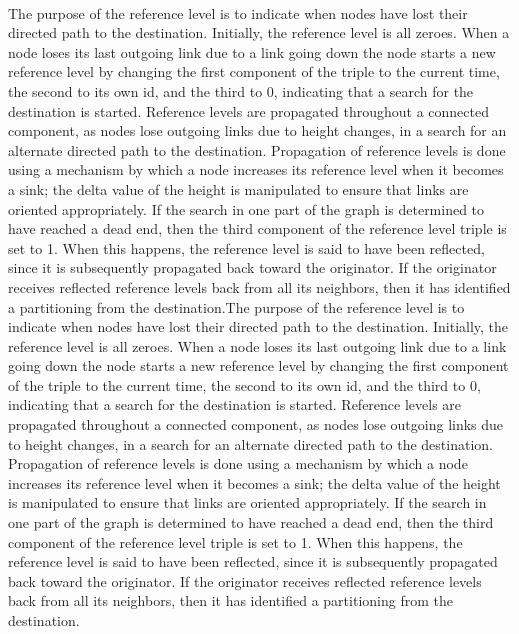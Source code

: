 \paragraph{}The purpose of the reference level is to indicate when nodes have lost their directed path to the destination. Initially, the reference level is all zeroes. When a node loses its last outgoing link due to a link going down the node starts a new reference level by changing the first component of the triple to the current time, the second to its own id, and the third to 0, indicating that a search for the destination is started. Reference levels are propagated throughout a connected component, as nodes lose outgoing links due to height changes, in a search for an alternate directed path to the destination. Propagation of reference levels is done using a mechanism by which a node increases its reference level when it becomes a sink; the delta value of the height is manipulated to ensure that links are oriented appropriately. If the search in one part of the graph is determined to have reached a dead end, then the third component of the reference level triple is set to 1. When this happens, the reference level is said to have been reflected, since it is subsequently propagated back toward the originator. If the originator receives reflected reference levels back from all its neighbors, then it has identified a partitioning from the destination.The purpose of the reference level is to indicate when nodes have lost their directed path to the destination. Initially, the reference level is all zeroes. When a node loses its last outgoing link due to a link going down the node starts a new reference level by changing the first component of the triple to the current time, the second to its own id, and the third to 0, indicating that a search for the destination is started. Reference levels are propagated throughout a connected component, as nodes lose outgoing links due to height changes, in a search for an alternate directed path to the destination. Propagation of reference levels is done using a mechanism by which a node increases its reference level when it becomes a sink; the delta value of the height is manipulated to ensure that links are oriented appropriately. If the search in one part of the graph is determined to have reached a dead end, then the third component of the reference level triple is set to 1. When this happens, the reference level is said to have been reflected, since it is subsequently propagated back toward the originator. If the originator receives reflected reference levels back from all its neighbors, then it has identified a partitioning from the destination.
